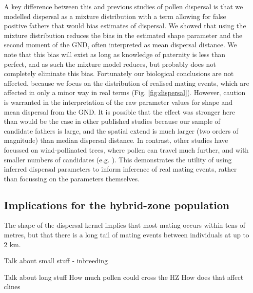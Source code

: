 \documentclass[10pt, a4paper, twocolumn]{article} %
\begin{document}
A key difference between this and previous studies of pollen dispersal is that we modelled dispersal as a mixture distribution with a term allowing for false positive fathers that would bias estimates of dispersal.
We showed that using the mixture distribution reduces the bias in the estimated shape parameter and the second moment of the GND, often interpreted as mean dispersal distance.
We note that this bias will exist as long as knowledge of paternity is less than perfect, and as such the mixture model reduces, but probably does not completely eliminate this bias. 
Fortunately our biological conclusions are not affected, because we focus on the distribution of realised mating events, which are affected in only a minor way in real terms (Fig. \ref{fig:dispersal}).
However, caution is warranted in the interpretation of the raw parameter values for shape and mean dispersal from the GND.
It is possible that the effect was stronger here than would be the case in other published studies because our sample of candidate fathers is large, and the spatial extend is much larger (two orders of magnitude) than median dispersal distance.
In contrast, other studies have focussed on wind-pollinated trees, where pollen can travel much further, and with smaller numbers of candidates (e.g. \cite{adams1992using, austerlitz2004using, klein2008pollen}).
This demonstrates the utility of using inferred dispersal parameters to inform inference of real mating events, rather than focussing on the parameters themselves.

\subsection{Implications for the hybrid-zone population}
The shape of the dispersal kernel implies that most mating occurs within tens of metres, but that there is a long tail of mating events between individuals at up to 2 km.

Talk about small stuff - inbreeding

Talk about long stuff
How much pollen could cross the HZ
How does that affect clines



\printbibliography[title={Bibliography}] %

\end{document}
